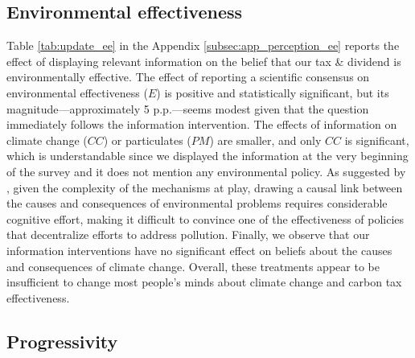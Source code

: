 \documentclass[12pt]{article} %
\begin{document}
\subsection{Environmental effectiveness}\label{subsec:update_ee}



Table \ref{tab:update_ee} in the Appendix \ref{subsec:app_perception_ee} reports the effect of displaying relevant information on the belief that our tax \& dividend is environmentally effective. The effect of reporting a scientific consensus on environmental effectiveness ($E$) is positive and statistically significant, but its magnitude---approximately 5 p.p.---seems modest given that the question immediately follows the information intervention. The effects of information on climate change ($CC$) or particulates ($PM$) are smaller, and only $CC$ is significant, which is understandable since we displayed the information at the very beginning of the survey and it does not mention any environmental policy. As suggested by \citet{millner_beliefs_2016}, given the complexity of the mechanisms at play, drawing a causal link between the causes and consequences of environmental problems requires considerable cognitive effort, making it difficult to convince one of the effectiveness of policies that decentralize efforts to address pollution. Finally, we observe that our information interventions have no significant effect on beliefs about the causes and consequences of climate change. Overall, these treatments appear to be insufficient to change most people's minds about climate change and carbon tax effectiveness. %

\subsection{Progressivity\label{subsec:persistence-prog}}

\end{document}
